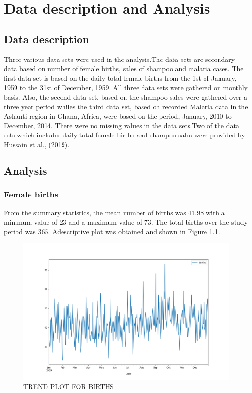 \documentclass[12pt, letterpaper, twoside]{article}
\begin{document}
\section{Data description and Analysis}
\subsection{Data description}
Three various data sets were used in the analysis.The data sets are secondary data based on number of female births, sales of shampoo and malaria cases. The first data set is based on the daily total female births from the 1st of January, 1959 to the 31st of December, 1959. All three data sets were gathered on monthly basis. Also, the second data set, based on the shampoo sales were gathered over a three year period whiles the third data set, based on recorded Malaria data in the Ashanti region in Ghana, Africa, were based on the period, January, 2010 to December, 2014. There were no missing values in the data sets.Two of the data sets which includes daily total female births and shampoo sales were provided by Hussain et al., (2019).
\subsection{Analysis}
\subsubsection{Female births}
From the summary statistics, the mean number of births was 41.98 with a minimum value of 23 and a maximum value of 73. The total births over the study period was 365. Adescriptive plot was obtained and shown in Figure 1.1. 
\begin{figure}
	    \centering
		\includegraphics[width=1\textwidth]{Birth_data_Trend_plot.png}
		    \caption{TREND PLOT FOR BIRTHS}
		        \label{fig:1.1}
\end{figure}
\end{document}
